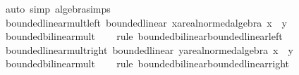 \begin{isabellebody}
\isamarkupfalse%
\ {\isacharparenleft}{\kern0pt}auto\ simp{\isacharcolon}{\kern0pt}\ algebra{\isacharunderscore}{\kern0pt}simps{\isacharparenright}{\kern0pt}%
\endisatagproof
{\isafoldproof}%
%
\isadelimproof
\isanewline
%
\endisadelimproof
\isanewline
{}\isamarkupfalse%
\ bounded{\isacharunderscore}{\kern0pt}linear{\isacharunderscore}{\kern0pt}mult{\isacharunderscore}{\kern0pt}left{\isacharcolon}{\kern0pt}\ {\isachardoublequoteopen}bounded{\isacharunderscore}{\kern0pt}linear\ {\isacharparenleft}{\kern0pt}{\isasymlambda}x{\isacharcolon}{\kern0pt}{\isacharcolon}{\kern0pt}{\isacharprime}{\kern0pt}a{\isacharcolon}{\kern0pt}{\isacharcolon}{\kern0pt}real{\isacharunderscore}{\kern0pt}normed{\isacharunderscore}{\kern0pt}algebra{\isachardot}{\kern0pt}\ x\ {\isacharasterisk}{\kern0pt}\ y{\isacharparenright}{\kern0pt}{\isachardoublequoteclose}\isanewline
%
\isadelimproof
\ \ %
\endisadelimproof
%
\isatagproof
{}\isamarkupfalse%
\ bounded{\isacharunderscore}{\kern0pt}bilinear{\isacharunderscore}{\kern0pt}mult\isanewline
\ \ \isamarkupfalse%
\ {\isacharparenleft}{\kern0pt}rule\ bounded{\isacharunderscore}{\kern0pt}bilinear{\isachardot}{\kern0pt}bounded{\isacharunderscore}{\kern0pt}linear{\isacharunderscore}{\kern0pt}left{\isacharparenright}{\kern0pt}%
\endisatagproof
{\isafoldproof}%
%
\isadelimproof
\isanewline
%
\endisadelimproof
\isanewline
{}\isamarkupfalse%
\ bounded{\isacharunderscore}{\kern0pt}linear{\isacharunderscore}{\kern0pt}mult{\isacharunderscore}{\kern0pt}right{\isacharcolon}{\kern0pt}\ {\isachardoublequoteopen}bounded{\isacharunderscore}{\kern0pt}linear\ {\isacharparenleft}{\kern0pt}{\isasymlambda}y{\isacharcolon}{\kern0pt}{\isacharcolon}{\kern0pt}{\isacharprime}{\kern0pt}a{\isacharcolon}{\kern0pt}{\isacharcolon}{\kern0pt}real{\isacharunderscore}{\kern0pt}normed{\isacharunderscore}{\kern0pt}algebra{\isachardot}{\kern0pt}\ x\ {\isacharasterisk}{\kern0pt}\ y{\isacharparenright}{\kern0pt}{\isachardoublequoteclose}\isanewline
%
\isadelimproof
\ \ %
\endisadelimproof
%
\isatagproof
{}\isamarkupfalse%
\ bounded{\isacharunderscore}{\kern0pt}bilinear{\isacharunderscore}{\kern0pt}mult\isanewline
\ \ \isamarkupfalse%
\ {\isacharparenleft}{\kern0pt}rule\ bounded{\isacharunderscore}{\kern0pt}bilinear{\isachardot}{\kern0pt}bounded{\isacharunderscore}{\kern0pt}linear{\isacharunderscore}{\kern0pt}right{\isacharparenright}{\kern0pt}%
\endisatagproof
{\isafoldproof}%
%
\isadelimproof
\isanewline
%
\endisadelimproof
\isanewline
{}\isamarkupfalse%

\end{isabellebody}
